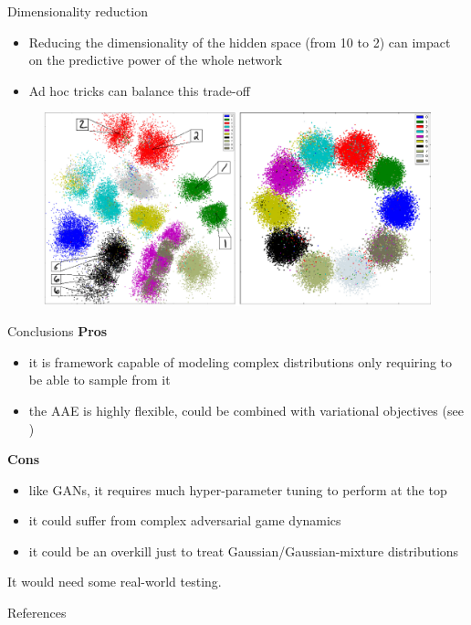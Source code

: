 \documentclass[10pt]{beamer}
\begin{document}
\begin{frame}{Dimensionality reduction}
\begin{itemize}
  \item Reducing the dimensionality of the hidden space (from 10 to 2) can impact on the predictive power of the whole network
  \item Ad hoc tricks can balance this trade-off
\end{itemize}
\begin{figure}
  \centering
  \includegraphics[width=\linewidth]{../images/dim_reduction-scatter-01.png}
\end{figure}
\end{frame}

\begin{frame}{Conclusions}
\textbf{Pros}
\begin{itemize}
  \item it is framework capable of modeling complex distributions only requiring to be able to sample from it
  \item the AAE is highly flexible, could be combined with variational objectives (see \cite{rosca2017variational})
\end{itemize}

\textbf{Cons}
\begin{itemize}
  \item like GANs, it requires much hyper-parameter tuning to perform at the top
  \item it could suffer from complex adversarial game dynamics
  \item it could be an overkill just to treat Gaussian/Gaussian-mixture distributions
\end{itemize}

{\footnotesize * It would need some real-world testing.}
\end{frame}

\begin{frame}{References}
\nocite{bengio2013better}
\nocite{bengio2014deep}
\nocite{goodfellow2014generative}
\nocite{kingma2013auto}
\nocite{maaloe2016auxiliary}
\nocite{li2015generative}
\nocite{nagabushan2017}
\nocite{harang2018adversarial}

\printbibliography
\end{frame}
\end{document}
